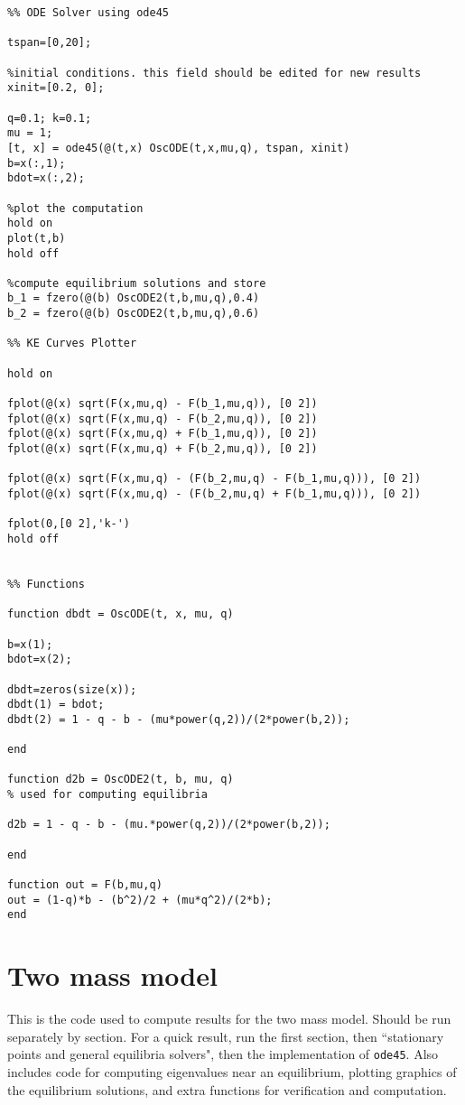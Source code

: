 \documentclass{report}
\begin{document}
\begin{verbatim}
%% ODE Solver using ode45

tspan=[0,20];

%initial conditions. this field should be edited for new results
xinit=[0.2, 0];

q=0.1; k=0.1;
mu = 1;
[t, x] = ode45(@(t,x) OscODE(t,x,mu,q), tspan, xinit)
b=x(:,1);
bdot=x(:,2);

%plot the computation
hold on
plot(t,b)
hold off

%compute equilibrium solutions and store
b_1 = fzero(@(b) OscODE2(t,b,mu,q),0.4)
b_2 = fzero(@(b) OscODE2(t,b,mu,q),0.6)

%% KE Curves Plotter

hold on

fplot(@(x) sqrt(F(x,mu,q) - F(b_1,mu,q)), [0 2])
fplot(@(x) sqrt(F(x,mu,q) - F(b_2,mu,q)), [0 2])
fplot(@(x) sqrt(F(x,mu,q) + F(b_1,mu,q)), [0 2])
fplot(@(x) sqrt(F(x,mu,q) + F(b_2,mu,q)), [0 2])

fplot(@(x) sqrt(F(x,mu,q) - (F(b_2,mu,q) - F(b_1,mu,q))), [0 2])
fplot(@(x) sqrt(F(x,mu,q) - (F(b_2,mu,q) + F(b_1,mu,q))), [0 2])

fplot(0,[0 2],'k-')
hold off


%% Functions

function dbdt = OscODE(t, x, mu, q)

b=x(1);
bdot=x(2);

dbdt=zeros(size(x));
dbdt(1) = bdot;
dbdt(2) = 1 - q - b - (mu*power(q,2))/(2*power(b,2));

end

function d2b = OscODE2(t, b, mu, q)
% used for computing equilibria

d2b = 1 - q - b - (mu.*power(q,2))/(2*power(b,2));

end

function out = F(b,mu,q)
out = (1-q)*b - (b^2)/2 + (mu*q^2)/(2*b);
end
\end{verbatim}

\section{Two mass model}

This is the code used to compute results for the two mass model.
Should be run separately by section.
For a quick result, run the first section,
then ``stationary points and general equilibria solvers",
then the implementation of \texttt{ode45}.
Also includes code for computing eigenvalues near an equilibrium,
plotting graphics of the equilibrium solutions,
and extra functions for verification and computation.
\end{document}
